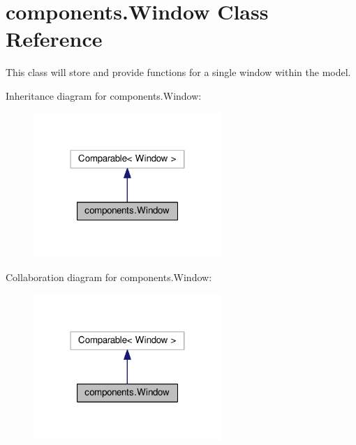 \hypertarget{classcomponents_1_1_window}{}\section{components.\+Window Class Reference}
\label{classcomponents_1_1_window}


This class will store and provide functions for a single window within the model.  




Inheritance diagram for components.\+Window\+:\nopagebreak
\begin{figure}[H]
\begin{center}
\leavevmode
\includegraphics[width=202pt]{classcomponents_1_1_window__inherit__graph}
\end{center}
\end{figure}


Collaboration diagram for components.\+Window\+:\nopagebreak
\begin{figure}[H]
\begin{center}
\leavevmode
\includegraphics[width=202pt]{classcomponents_1_1_window__coll__graph}
\end{center}
\end{figure}
